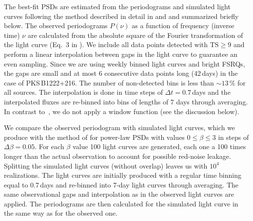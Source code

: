 \documentclass[twocolumn,linenumbers]{aastex62}
\begin{document}
The best-fit PSDs are estimated from the periodograms and simulated light curves following the method described in detail in \citet{2014MNRAS.445..437M} and \citet{2013MNRAS.433..907E} and summarized briefly below.
The observed periodograms $P(\nu)$ as a function of frequency (inverse time) $\nu$ are calculated from the absolute square of the Fourier transformation of the light curve (Eq.~3 in \citealt{2014MNRAS.445..437M}). 
We include all data points detected with $\mathrm{TS} \geqslant 9$ and perform a linear interpolation between gaps in the light curve to guarantee an even sampling. 
Since we are using weekly binned light curves and bright FSRQs, the gaps are small and at most 6 consecutive data points long (42\,days) in the case of PKS\,B1222+216. The number of non-detected bins is less than $\sim13\,\%$ for all sources.
The interpolation is done in time steps of $\Delta t=0.7\,$days and 
 the interpolated fluxes are re-binned into bins of lengths of 7 days through averaging.
In contrast to~\citet{2014MNRAS.445..437M}, we do not apply a window function (see the discussion below). 

We compare the observed periodogram with simulated light curves, which we produce with the method of \citet{1995A&A...300..707T} for power-law PSDs with values $0 \leqslant \beta \leqslant 3$ in steps of $\Delta\beta = 0.05$. For each $\beta$ value 100 light curves are generated, each one a 100 times longer than the actual observation to account for possible red-noise leakage. Splitting the simulated light curves (without overlap) leaves us with $10^4$ realizations. 
The light curves are initially produced with a regular time binning equal to 0.7\,days and  re-binned into 7-day light curves through averaging. 
The same observational gaps and interpolation as in the observed light curves are applied. 
The periodograms are then calculated for the simulated light curve in the same way as for the observed one.
\end{document}

